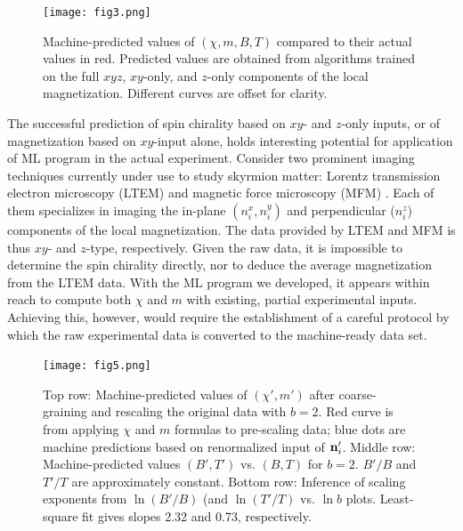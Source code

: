 \documentclass[reprint,amsmath,amssymb,aps,showpacs,superscriptaddress,prb]{revtex4-1}
\renewcommand{\v}[1]{{\bf #1}}
\begin{document}
\begin{figure}[h]
\texttt{[image: fig3.png]}
\caption{Machine-predicted values of $(\chi, m, B, T)$ compared to their actual values in red. Predicted values are obtained from algorithms trained on the full $xyz$, $xy$-only, and $z$-only components of the local magnetization. Different curves are offset for clarity.}\label{fig:3}
\end{figure}

The successful prediction of spin chirality based on $xy$- and $z$-only inputs, or of magnetization based on $xy$-input alone, holds interesting potential for application of ML program in the actual experiment.
Consider two prominent imaging techniques currently under use to study skyrmion matter: Lorentz transmission electron microscopy (LTEM) \cite{tokura10} and magnetic force microscopy (MFM) \cite{pana17}. Each of them specializes in imaging the in-plane $(n^x_i , n^y_i )$ and perpendicular ($n^z_i$) components of the local magnetization. The data provided by LTEM and MFM is thus $xy$- and $z$-type, respectively.  Given the raw data, it is impossible to determine the spin chirality directly, nor to deduce the average magnetization from the LTEM data. With the ML program we developed, it appears within reach to compute both $\chi$ and $m$ with existing, partial experimental inputs. Achieving this, however, would require the establishment of a careful protocol by which the raw experimental data is converted to the machine-ready data set.

\begin{figure}[t]
\texttt{[image: fig5.png]}
\caption{Top row: Machine-predicted values of $(\chi', m' )$ after coarse-graining and rescaling the original data with $b=2$. Red curve is from applying $\chi$ and $m$ formulas to pre-scaling data; blue dots are machine predictions based on renormalized input of $\v n'_i$. Middle row: Machine-predicted values $(B', T')$ vs. $(B, T)$ for $b=2$. $B'/B$ and $T'/T$ are approximately constant. Bottom row: Inference of scaling exponents from $\ln (B'/B )$ (and $\ln (T' /T)$ vs. $\ln b$ plots. Least-square fit gives slopes 2.32 and 0.73, respectively. } \label{fig:5}
\end{figure}
\end{document}
